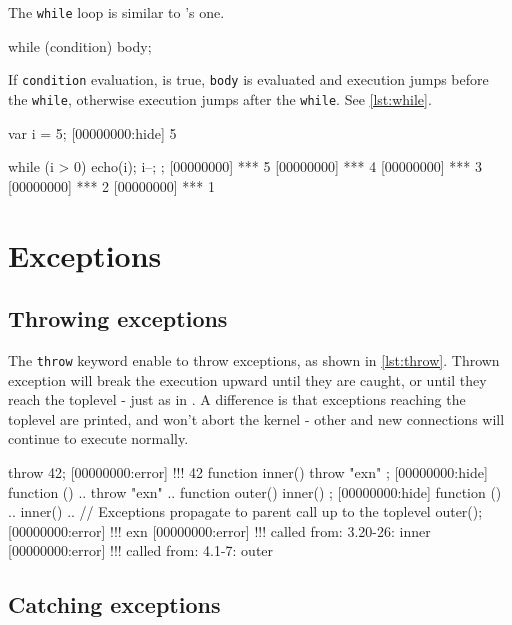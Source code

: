 The \lstinline|while| loop is similar to \C's one.

\begin{urbiscript}[frame=, backgroundcolor=, ]
while (condition)
  body;
\end{urbiscript}

If \lstinline|condition| evaluation, is true, \lstinline|body| is
evaluated and execution jumps before the \lstinline|while|, otherwise execution
jumps after the \lstinline|while|. See \autoref{lst:while}.

\begin{urbiscript}[caption=The \lstinline|while| construct, label=lst:while,
  float=\floatpos]
var i = 5;
[00000000:hide] 5

while (i > 0)
{
  echo(i);
  i--;
};
[00000000] *** 5
[00000000] *** 4
[00000000] *** 3
[00000000] *** 2
[00000000] *** 1
\end{urbiscript}

\FloatBarrier
\section{Exceptions}

\subsection{Throwing exceptions}

The \lstinline|throw| keyword enable to throw exceptions, as shown in
\autoref{lst:throw}. Thrown exception will break the execution upward
until they are caught, or until they reach the toplevel - just as in
\Cxx. A difference is that exceptions reaching the toplevel are
printed, and won't abort the kernel - other and new connections will
continue to execute normally.

\begin{urbiscript}[caption=Throwing exceptions, label=lst:throw,
  float=\floatpos]
throw 42;
[00000000:error] !!! 42
function inner() { throw "exn" };
[00000000:hide] function () {
..  throw "exn"
..}
function outer() { inner() };
[00000000:hide] function () {
..  inner()
..}
// Exceptions propagate to parent call up to the toplevel
outer();
[00000000:error] !!! exn
[00000000:error] !!!    called from: 3.20-26: inner
[00000000:error] !!!    called from: 4.1-7: outer
\end{urbiscript}

\subsection{Catching exceptions}

